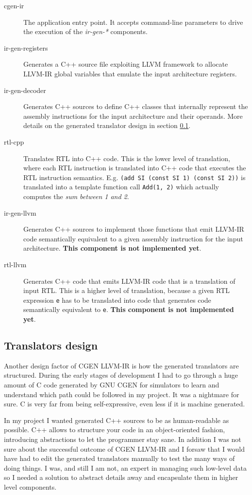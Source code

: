 \documentclass{article}
\begin{document}
\begin{description}
\item[cgen-ir] The application entry point. It accepts command-line parameters to drive the execution of the \emph{ir-gen-*} components.
\item[ir-gen-registers] Generates a C++ source file exploiting LLVM framework to allocate LLVM-IR global variables that emulate the input architecture registers.
\item[ir-gen-decoder] Generates C++ sources to define C++ classes that internally represent the assembly instructions for the input architecture and their operands. More details on the generated translator design in section \ref{sec:cpp-trans}.
\item[rtl-cpp] Translates RTL into C++ code. This is the lower level of translation, where each RTL instruction is translated into C++ code that executes the RTL instruction semantics. E.g. \texttt{(add SI (const SI 1) (const SI 2))} is translated into a template function call \texttt{Add(1, 2)} which actually computes the \emph{sum between 1 and 2}.
\item[ir-gen-llvm] Generates C++ sources to implement those functions that emit LLVM-IR code semantically equivalent to a given assembly instruction for the input architecture. \textbf{This component is not implemented yet}.
\item[rtl-llvm] Generates C++ code that emits LLVM-IR code that is a translation of input RTL. This is a higher level of translation, because a given RTL expression \texttt{e} has to be translated into code that generates code semantically equivalent to \texttt{e}. \textbf{This component is not implemented yet}.
\end{description}

\subsection{Translators design} \label{sec:cpp-trans}
Another design factor of CGEN LLVM-IR is how the generated translators are structured. During the early stages of development I had to go through a huge amount of C code generated by GNU CGEN for simulators to learn and understand which path could be followed in my project. It was a nightmare for sure. C is very far from being self-expressive, even less if it is machine generated.

In my project I wanted generated C++ sources to be as human-readable as possible. C++ allows to structure your code in an object-oriented fashion, introducing abstractions to let the programmer stay sane. In addition I was not sure about the successful outcome of CGEN LLVM-IR and I forsaw that I would have had to edit the generated translators manually to test the many ways of doing things. I was, and still I am not, an expert in managing such low-level data so I needed a solution to abstract details away and encapsulate them in higher level components.
\end{document}
